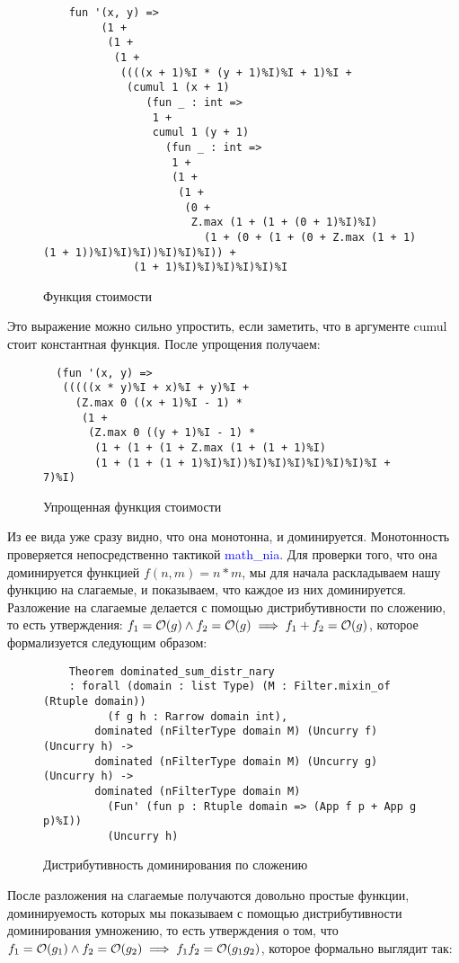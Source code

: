 \begin{figure}[H]
  \caption{Функция стоимости}
  \label{code:cost_function}
  \begin{verbatim}
    fun '(x, y) =>
         (1 +
          (1 +
           (1 +
            ((((x + 1)%I * (y + 1)%I)%I + 1)%I +
             (cumul 1 (x + 1)
                (fun _ : int =>
                 1 +
                 cumul 1 (y + 1)
                   (fun _ : int =>
                    1 +
                    (1 +
                     (1 +
                      (0 +
                       Z.max (1 + (1 + (0 + 1)%I)%I)
                         (1 + (0 + (1 + (0 + Z.max (1 + 1) (1 + 1))%I)%I)%I))%I)%I)%I)) +
              (1 + 1)%I)%I)%I)%I)%I)%I
  \end{verbatim}
\end{figure}

Это выражение можно сильно упростить, если заметить, что в аргументе cumul стоит константная функция. После упрощения получаем:

\begin{figure}[H]
  \caption{Упрощенная функция стоимости}
  \label{code:simplified_cost_function}
  \begin{verbatim}
  (fun '(x, y) =>
   (((((x * y)%I + x)%I + y)%I +
     (Z.max 0 ((x + 1)%I - 1) *
      (1 +
       (Z.max 0 ((y + 1)%I - 1) *
        (1 + (1 + (1 + Z.max (1 + (1 + 1)%I) 
        (1 + (1 + (1 + 1)%I)%I))%I)%I)%I)%I)%I)%I)%I + 7)%I)
  \end{verbatim}
\end{figure}

Из ее вида уже сразу видно, что она монотонна, и доминируется. Монотонность проверяется непосредственно тактикой \textcolor{blue}{math\_nia}.
Для проверки того, что она доминируется функцией $f(n, m) = n*m$, мы для начала раскладываем нашу функцию на слагаемые, и показываем,
что каждое из них доминируется. Разложение на слагаемые делается с помощью дистрибутивности по сложению, то есть утверждения:
$f_1 = \mathcal{O}(g) \land f_2 = \mathcal{O}(g) \implies f_1 + f_2 = \mathcal{O}(g)$, которое формализуется следующим образом:


\begin{figure}[H]
  \caption{Дистрибутивность доминирования по сложению}
  \label{code:dominated_sum_distr_nary}
  \begin{verbatim}
    Theorem dominated_sum_distr_nary
    : forall (domain : list Type) (M : Filter.mixin_of (Rtuple domain))
          (f g h : Rarrow domain int),
        dominated (nFilterType domain M) (Uncurry f) (Uncurry h) ->
        dominated (nFilterType domain M) (Uncurry g) (Uncurry h) ->
        dominated (nFilterType domain M)
          (Fun' (fun p : Rtuple domain => (App f p + App g p)%I)) 
          (Uncurry h)
  \end{verbatim}
\end{figure}
После разложения на слагаемые получаются довольно простые функции, доминируемость которых мы показываем с помощью дистрибутивности
доминирования умножению, то есть утверждения о том, что \\
$f_1 = \mathcal{O}(g_1) \land f_2 = \mathcal{O}(g_2) \implies f_1f_2 = \mathcal{O}(g_1g_2)$, которое формально выглядит так:

